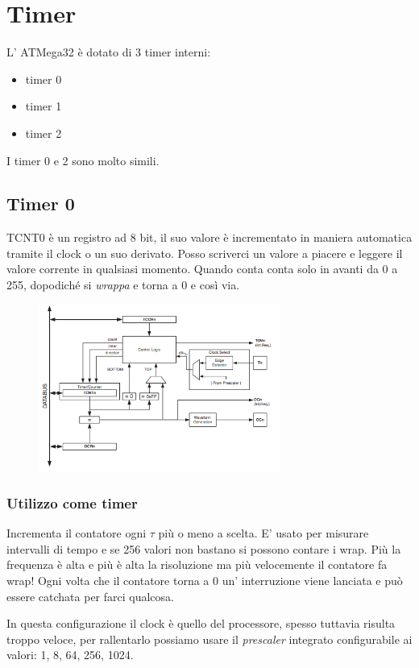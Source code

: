 \section{Timer}
L' ATMega32 è dotato di 3 timer interni:
\begin{itemize}
    \item timer 0
    \item timer 1
    \item timer 2
\end{itemize}
I timer 0 e 2 sono molto simili.

\subsection{Timer 0}
TCNT0 è un registro ad 8 bit, il suo valore è incrementato in maniera automatica tramite il clock o un suo derivato.
Posso scriverci un valore a piacere e leggere il valore corrente in qualsiasi momento.
Quando conta conta solo in avanti da 0 a 255, dopodiché si \emph{wrappa} e torna a 0 e così via.

\begin{figure}[H]
    \centering
    \includegraphics[width=300px]{images/18_Timer/Timer0.png}
\end{figure}

\subsubsection{Utilizzo come timer}
Incrementa il contatore ogni $\tau$ più o meno a scelta.
E' usato per misurare intervalli di tempo e se 256 valori non bastano si possono contare i wrap.
Più la frequenza è alta e più è alta la risoluzione ma più velocemente il contatore fa wrap!
Ogni volta che il contatore torna a 0 un' interruzione viene lanciata e può essere catchata per farci qualcosa.

In questa configurazione il clock è quello del processore, spesso tuttavia risulta troppo veloce, per rallentarlo possiamo usare il \emph{prescaler} integrato configurabile ai valori: 1, 8, 64, 256, 1024.

